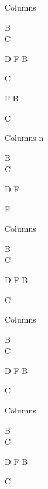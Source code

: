 \documentclass[english,notes]{beamer}
\begin{document}
\begin{frame}{Columns}
    \begin{cols}

            B\\
            C

            D
            F
            B

            C
    \end{cols}
    \begin{cols}
            F
            B

            C
    \end{cols}
\end{frame}

\begin{frame}{Columns n}

    B\\
    C

    D
    F

    F
\end{frame}

\begin{frame}{Columns}
    \begin{cols}

            B\\
            C

            D
            F
            \Huge B

            C
    \end{cols}
\end{frame}

\begin{frame}{Columns}
    \begin{cols}

            B\\
            C

            D
            F
            B

            C
    \end{cols}
\end{frame}

\begin{frame}{Columns}
    \begin{cols}

            B\\
            C

            D
            F
            B

            C
    \end{cols}
\end{frame}
\end{document}
